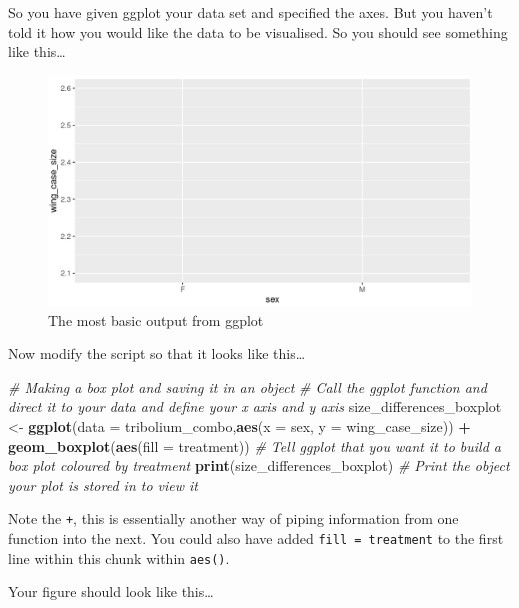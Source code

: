 \documentclass[
]{book}
\newenvironment{Shaded}{\begin{snugshade}}{\end{snugshade}}
\newcommand{\AttributeTok}[1]{\textcolor[rgb]{0.13,0.29,0.53}{#1}}
\newcommand{\CommentTok}[1]{\textcolor[rgb]{0.56,0.35,0.01}{\textit{#1}}}
\newcommand{\FunctionTok}[1]{\textcolor[rgb]{0.13,0.29,0.53}{\textbf{#1}}}
\newcommand{\NormalTok}[1]{#1}
\newcommand{\OtherTok}[1]{\textcolor[rgb]{0.56,0.35,0.01}{#1}}
\newcommand{\SpecialCharTok}[1]{\textcolor[rgb]{0.81,0.36,0.00}{\textbf{#1}}}
\begin{document}
So you have given ggplot your data set and specified the axes. But you haven't told it how you would like the data to be visualised. So you should see something like this\ldots{}

\begin{figure}
\includegraphics[width=0.9\linewidth]{figures/screenshot_deconstructingaplot_1} \caption{The most basic output from ggplot}\label{fig:unnamed-chunk-50}
\end{figure}

Now modify the script so that it looks like this\ldots{}

\begin{Shaded}
\begin{Highlighting}[]
\CommentTok{\# Making a box plot and saving it in an object}
\CommentTok{\# Call the ggplot function and direct it to your data and define your x axis and y axis}
\NormalTok{size\_differences\_boxplot }\OtherTok{\textless{}{-}} \FunctionTok{ggplot}\NormalTok{(}\AttributeTok{data =}\NormalTok{ tribolium\_combo,}\FunctionTok{aes}\NormalTok{(}\AttributeTok{x =}\NormalTok{ sex, }\AttributeTok{y =}\NormalTok{ wing\_case\_size)) }\SpecialCharTok{+} 
  \FunctionTok{geom\_boxplot}\NormalTok{(}\FunctionTok{aes}\NormalTok{(}\AttributeTok{fill =}\NormalTok{ treatment)) }\CommentTok{\# Tell ggplot that you want it to build a box plot coloured by treatment}
\FunctionTok{print}\NormalTok{(size\_differences\_boxplot) }\CommentTok{\# Print the object your plot is stored in to view it}
\end{Highlighting}
\end{Shaded}

Note the \texttt{+}, this is essentially another way of piping information from one function into the next. You could also have added \texttt{fill\ =\ treatment} to the first line within this chunk within \texttt{aes()}.

Your figure should look like this\ldots{}
\end{document}
